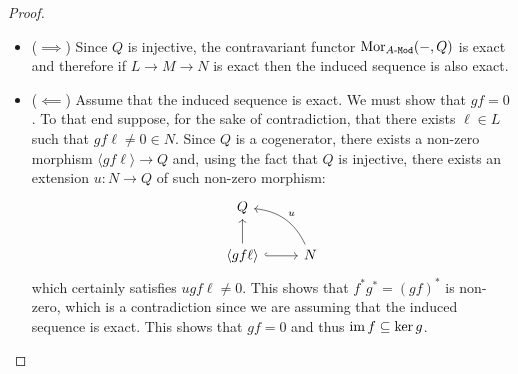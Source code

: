 \begin{proof}
    \begin{itemize}\setlength\itemsep{0em}
        \item (\(\implies\)) Since \(Q\) is injective, the contravariant functor
              \(\operatorname{Mor}_{{A\text{-}\texttt{Mod}}}(-, Q)\) is exact and therefore if \(L \to M \to N\) is exact then
              the induced sequence is also exact.

        \item (\(\impliedby\)) Assume that the induced sequence is exact. We must show
              that \(g f = 0\). To that end suppose, for the sake of contradiction, that
              there exists \(\ell \in L\) such that \(g f \ell \neq 0 \in N\). Since \(Q\) is a
              cogenerator, there exists a non-zero morphism \(\langle g f \ell \rangle \to Q\) and, using the
              fact that \(Q\) is injective, there exists an extension \(u: N \to Q\) of such
              non-zero morphism:
              \[
                  \begin{tikzcd}
                      Q & \\
                      \langle g f \ell \rangle \ar[r, hook] \ar[u]
                      &N \ar[lu, bend right, "u"']
                  \end{tikzcd}
              \]
              which certainly satisfies \(u g f \ell \neq 0\). This shows that
              \(f^{*} g^{*} = (g f)^{*}\) is non-zero, which is a contradiction since we are
              assuming that the induced sequence is exact. This shows that \(g f = 0\) and
              thus \(\operatorname{im} f \subseteq \ker g\).


\end{itemize}
\end{proof}
